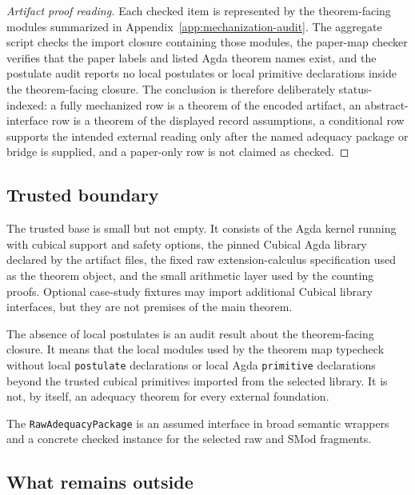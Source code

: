 \documentclass{lmcs}
\begin{document}
\begin{proof}[Artifact proof reading]
Each checked item is represented by the theorem-facing modules summarized in
Appendix~\ref{app:mechanization-audit}.  The aggregate script checks the import closure
containing those modules, the paper-map checker verifies that the paper labels and listed Agda
theorem names exist, and the postulate audit reports no local postulates or local primitive
declarations inside the theorem-facing closure.  The conclusion is therefore deliberately
status-indexed: a fully mechanized row is a theorem of the encoded artifact, an
abstract-interface row is a theorem of the displayed record assumptions, a conditional row
supports the intended external reading only after the named adequacy package or bridge is
supplied, and a paper-only row is not claimed as checked.
\end{proof}

\subsection{Trusted boundary}
\label{subsec:mechanization-trusted-boundary}

The trusted base is small but not empty.  It consists of the Agda kernel running with cubical
support and safety options, the pinned Cubical Agda library declared by the artifact files, the
fixed raw extension-calculus specification used as the theorem object, and the small arithmetic
layer used by the counting proofs.  Optional case-study fixtures may import additional Cubical
library interfaces, but they are not premises of the main theorem.

The absence of local postulates is an audit result about the theorem-facing closure.  It means
that the local modules used by the theorem map typecheck without local \texttt{postulate}
declarations or local Agda \texttt{primitive} declarations beyond the trusted cubical primitives
imported from the selected library.  It is not, by itself, an adequacy theorem for every external
foundation.

The \texttt{RawAdequacyPackage} is an assumed interface in broad semantic wrappers and a
concrete checked instance for the selected raw and SMod fragments.

\subsection{What remains outside}
\label{subsec:outside-mechanized-claim}
\end{document}
